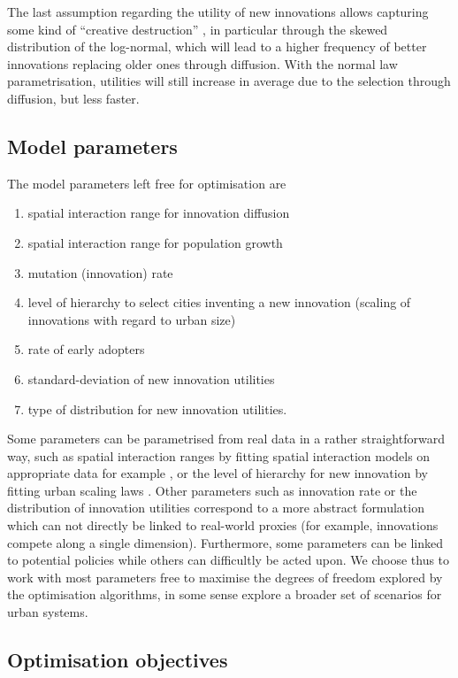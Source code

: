 \documentclass[final,5p,times,twocolumn,authoryear]{elsarticle}
\begin{document}
The last assumption regarding the utility of new innovations allows capturing some kind of ``creative destruction'' \citep{diamond2006schumpeter}, in particular through the skewed distribution of the log-normal, which will lead to a higher frequency of better innovations replacing older ones through diffusion. With the normal law parametrisation, utilities will still increase in average due to the selection through diffusion, but less faster.


\subsection{Model parameters}

The model parameters left free for optimisation are

\begin{enumerate}
    \item spatial interaction range for innovation diffusion
    \item spatial interaction range for population growth
    \item mutation (innovation) rate
    \item level of hierarchy to select cities inventing a new innovation (scaling of innovations with regard to urban size)
    \item rate of early adopters
    \item standard-deviation of new innovation utilities
    \item type of distribution for new innovation utilities.
\end{enumerate}

Some parameters can be parametrised from real data in a rather straightforward way, such as spatial interaction ranges by fitting spatial interaction models on appropriate data for example \citep{fotheringham1989spatial}, or the level of hierarchy for new innovation by fitting urban scaling laws \citep{pumain2006evolutionary}. Other parameters such as innovation rate or the distribution of innovation utilities correspond to a more abstract formulation which can not directly be linked to real-world proxies (for example, innovations compete along a single dimension). Furthermore, some parameters can be linked to potential policies while others can difficultly be acted upon. We choose thus to work with most parameters free to maximise the degrees of freedom explored by the optimisation algorithms, in some sense explore a broader set of scenarios for urban systems.


\subsection{Optimisation objectives}
\end{document}

